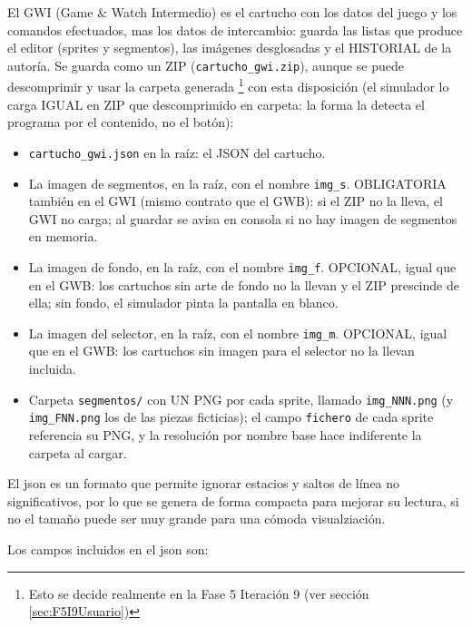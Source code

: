 El GWI (Game \& Watch Intermedio) es el cartucho con los datos del juego y los comandos efectuados, mas los datos de intercambio: guarda las listas que produce el editor (sprites y segmentos),
las imágenes desglosadas y el HISTORIAL de la autoría. Se guarda como un ZIP
(\texttt{cartucho\_gwi.zip}), aunque se puede descomprimir y usar la carpeta generada \footnote{Esto se decide realmente en la Fase 5 Iteración 9 (ver sección \ref{sec:F5I9Usuario})} con esta disposición (el simulador lo carga
IGUAL en ZIP que descomprimido en carpeta: la forma la detecta el
programa por el contenido, no el botón):

\begin{itemize}
	\item \texttt{cartucho\_gwi.json} en la raíz: el JSON del cartucho.
	\item La imagen de segmentos, en la raíz, con el nombre 
	\texttt{img\_s}. OBLIGATORIA también en el GWI (mismo contrato que el GWB): si el ZIP no la lleva, el GWI no carga; al guardar se avisa en consola si no hay imagen de segmentos en memoria.
	\item La imagen de fondo, en la raíz, con el nombre \texttt{img\_f}. OPCIONAL, igual que en el GWB: los cartuchos sin arte de fondo no la llevan y el ZIP prescinde de ella; sin fondo, el simulador pinta la pantalla en blanco.
	\item La imagen del selector, en la raíz, con el nombre \texttt{img\_m}. OPCIONAL, igual que en el GWB: los cartuchos sin imagen para el selector no la llevan incluida.
	\item Carpeta \texttt{segmentos/} con UN PNG por cada sprite, llamado
	\texttt{img\_NNN.png} (y \texttt{img\_FNN.png} los de las piezas
	ficticias); el campo \texttt{fichero} de cada sprite referencia su
	PNG, y la resolución por nombre base hace indiferente la carpeta al
	cargar.
\end{itemize}

El json es un formato que permite ignorar estacios y saltos de línea no significativos, por lo que se genera de forma compacta para mejorar su lectura, si no el tamaño puede ser muy grande para una cómoda visualziación.

Los campos incluidos en el json son:

{}

